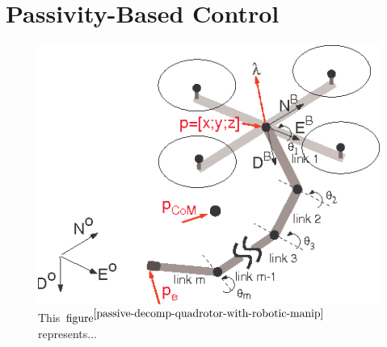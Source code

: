 \section{Passivity-Based Control} \label{section:pssivity}
\cite{passive-decomp-quadrotor-with-robotic-manip} \cite{passivity-based-formation-load}
\cite{passive-decomp-mechanical-coord-req} \cite{passive-variable-impedance-compliant} \cite{max-wrench-min-energy} \cite{quadrotor-itneraction-environment} \cite{passivity-based-payload-minimum-swing} \cite{passivity-based-crop} \cite{payload-and-human}
\cite{door-opening} \cite{decoupled-aerial-manipulation} \cite{passivity-backstepping} \cite{passivity-based-physical-interaction}
\begin{figure}[H]
	\includegraphics[width=0.9\columnwidth]{figure/aerial_manip.png}	
	\centering
	\caption{This $\text{figure}^{\cite{passive-decomp-quadrotor-with-robotic-manip}}$ represents... }
	\label{fig:aerial_manip}
\end{figure}